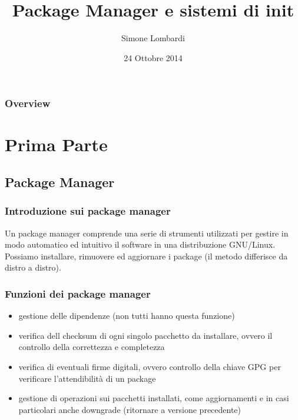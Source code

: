 \documentclass{beamer}
\title[Linux Day 2014]{Package Manager e sistemi di init}
\author{Simone Lombardi}
\institute[HCSSLUG] 
{
Universit\`a degli studi di Salerno \\ 
\medskip
\textit{smlb@archlinux.info} 
}
\date{24 Ottobre 2014}
\begin{document}
\begin{frame}
\titlepage 
\end{frame}

\begin{frame}
\frametitle{Overview} 
\tableofcontents 
\end{frame}


\section{Prima Parte} 

\subsection{Package Manager} 

\begin{frame}
\frametitle{Introduzione sui package manager}
Un package manager comprende una serie di strumenti utilizzati per gestire in modo automatico ed intuitivo il software in una distribuzione GNU/Linux. Possiamo installare, rimuovere ed aggiornare i package (il metodo differisce da distro a distro). 
\end{frame}


\begin{frame}
	\frametitle{Funzioni dei package manager}
	\begin{itemize}
		\item gestione delle dipendenze (non tutti hanno questa funzione)
		\item verifica dell checksum di ogni singolo pacchetto da installare, ovvero il controllo della correttezza e completezza
		\item verifica di eventuali firme digitali, ovvero controllo della chiave GPG per verificare l'attendibilit\`a di un package
		\item gestione di operazioni sui pacchetti installati, come aggiornamenti e in casi particolari anche downgrade (ritornare a versione precedente)
	\end{itemize}
\end{frame}
\end{document}
